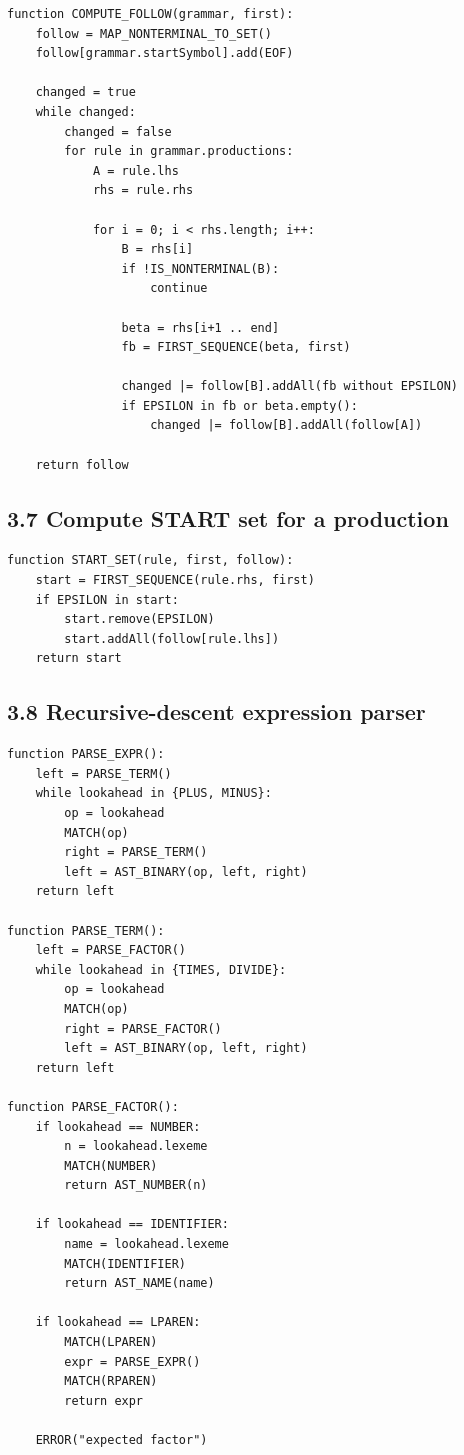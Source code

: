 \documentclass[10pt,letterpaper]{article}
\begin{document}
\begin{verbatim}
function COMPUTE_FOLLOW(grammar, first):
    follow = MAP_NONTERMINAL_TO_SET()
    follow[grammar.startSymbol].add(EOF)

    changed = true
    while changed:
        changed = false
        for rule in grammar.productions:
            A = rule.lhs
            rhs = rule.rhs

            for i = 0; i < rhs.length; i++:
                B = rhs[i]
                if !IS_NONTERMINAL(B):
                    continue

                beta = rhs[i+1 .. end]
                fb = FIRST_SEQUENCE(beta, first)

                changed |= follow[B].addAll(fb without EPSILON)
                if EPSILON in fb or beta.empty():
                    changed |= follow[B].addAll(follow[A])

    return follow
\end{verbatim}

\subsection*{3.7 Compute START set for a production}

\begin{verbatim}
function START_SET(rule, first, follow):
    start = FIRST_SEQUENCE(rule.rhs, first)
    if EPSILON in start:
        start.remove(EPSILON)
        start.addAll(follow[rule.lhs])
    return start
\end{verbatim}

\subsection*{3.8 Recursive-descent expression parser}

\begin{verbatim}
function PARSE_EXPR():
    left = PARSE_TERM()
    while lookahead in {PLUS, MINUS}:
        op = lookahead
        MATCH(op)
        right = PARSE_TERM()
        left = AST_BINARY(op, left, right)
    return left

function PARSE_TERM():
    left = PARSE_FACTOR()
    while lookahead in {TIMES, DIVIDE}:
        op = lookahead
        MATCH(op)
        right = PARSE_FACTOR()
        left = AST_BINARY(op, left, right)
    return left

function PARSE_FACTOR():
    if lookahead == NUMBER:
        n = lookahead.lexeme
        MATCH(NUMBER)
        return AST_NUMBER(n)

    if lookahead == IDENTIFIER:
        name = lookahead.lexeme
        MATCH(IDENTIFIER)
        return AST_NAME(name)

    if lookahead == LPAREN:
        MATCH(LPAREN)
        expr = PARSE_EXPR()
        MATCH(RPAREN)
        return expr

    ERROR("expected factor")
\end{verbatim}
\end{document}
